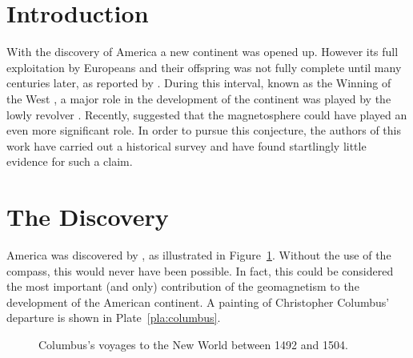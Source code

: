 \documentclass[jgrga]{aguplus}                     %
\begin{document}
\begin{article}

\section{Introduction}\label{sec:intro}


With the discovery of America \citep{colu92} a new continent was opened up.
However its full exploitation by Europeans and their offspring was not fully
complete until many centuries later, as reported by \citet{jame76}. During this
interval, known as the Winning of the West \citep{smit54}, a major role in
the development of the continent was played by the lowly revolver
\citep[e.g.][]{gree00}.  Recently, \citet{phil99} suggested that the
magnetosphere could have played an even more significant role. In order to
pursue this conjecture, the authors of this work have carried out a historical
survey and have found start\-ling\-ly little evidence for such a claim.

\section{The Discovery}
\label{sec:dis}

America was discovered by \citet{colu92}, as illustrated in Figure~\ref{fig:dis}.
Without the use of the compass, this would never have been possible. In fact,
this could be considered the most important (and only) contribution of the
geomagnetism to the development of the American continent.  A painting of
Christopher Columbus' departure is shown in
Plate~\ref{pla:columbus}.

\begin{figure}
  \caption[]{\label{fig:dis}
Columbus's voyages to the New World between 1492 and 1504.}
\end{figure}
\begin{plate*}
  \platewidth{35pc}
  \caption{\label{pla:columbus}
This lithograph shows famed explorer Christopher Columbus in 1492 departing
on his first voyage in search of a quicker route to Asia. Here, Columbus
takes leave of Ferdinand~V and Isabella, the king and queen of Castile, who
sponsored his first expedition.
(THE BETTMANN ARCHIVE)}
\end{plate*}


\end{article}
\end{document}
